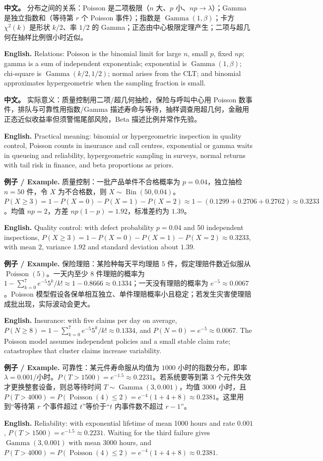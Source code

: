 \documentclass[UTF8,11pt,a4paper]{ctexart}
\newcommand{\EN}[1]{\par\noindent\textbf{English.} #1\par}
\newcommand{\EX}[2]{\par\noindent\textbf{例子 / Example.} #1\par\EN{#2}}
\newcommand{\APS}[2]{\par\noindent\textbf{中文。} #1\par\noindent\textbf{English.} #2\par\smallskip}
\begin{document}
\APS{分布之间的关系：Poisson 是二项极限（$n$ 大、$p$ 小、$np\to\lambda$）；Gamma 是独立指数和（等待第 $r$ 个 Poisson 事件）；指数是 $\operatorname{Gamma}(1,\beta)$；卡方 $\chi^2(k)$ 是形状 $k/2$、率 $1/2$ 的 Gamma；正态由中心极限定理产生；二项与超几何在抽样比例很小时近似。}{Relations: Poisson is the binomial limit for large $n$, small $p$, fixed $np$; gamma is a sum of independent exponentials; exponential is $\operatorname{Gamma}(1,\beta)$; chi-square is $\operatorname{Gamma}(k/2,1/2)$; normal arises from the CLT; and binomial approximates hypergeometric when the sampling fraction is small.}

\APS{实际意义：质量控制用二项/超几何抽检，保险与呼叫中心用 Poisson 数事件，排队与可靠性用指数/Gamma 描述寿命与等待，抽样调查用超几何，金融用正态近似收益率但须警惕尾部风险，Beta 描述比例并常作先验。}{Practical meaning: binomial or hypergeometric inspection in quality control, Poisson counts in insurance and call centres, exponential or gamma waits in queueing and reliability, hypergeometric sampling in surveys, normal returns with tail risk in finance, and beta proportions as priors.}

\EX{质量控制：一批产品单件不合格概率为 $p=0.04$，独立抽检 $n=50$ 件，令 $X$ 为不合格数，则 $X\sim\operatorname{Bin}(50,0.04)$。$P(X\ge3)=1-P(X=0)-P(X=1)-P(X=2)\approx1-(0.1299+0.2706+0.2762)\approx0.3233$。均值 $np=2$，方差 $np(1-p)=1.92$，标准差约为 $1.39$。}{Quality control: with defect probability $p=0.04$ and 50 independent inspections, $P(X\ge3)=1-P(X=0)-P(X=1)-P(X=2)\approx0.3233$, with mean $2$, variance $1.92$ and standard deviation about $1.39$.}

\EX{保险理赔：某险种每天平均理赔 $5$ 件，假定理赔件数近似服从 $\operatorname{Poisson}(5)$。一天内至少 $8$ 件理赔的概率为 $1-\sum_{k=0}^{7}e^{-5}5^k/k!\approx1-0.8666\approx0.1334$；一天没有理赔的概率为 $e^{-5}\approx0.0067$。Poisson 模型假设各保单相互独立、单件理赔概率小且稳定；若发生灾害使理赔成批出现，实际波动会更大。}{Insurance: with five claims per day on average, $P(N\ge8)=1-\sum_{k=0}^{7}e^{-5}5^k/k!\approx0.1334$, and $P(N=0)=e^{-5}\approx0.0067$. The Poisson model assumes independent policies and a small stable claim rate; catastrophes that cluster claims increase variability.}

\EX{可靠性：某元件寿命服从均值为 $1000$ 小时的指数分布，即率 $\lambda=0.001$/小时。$P(T>1500)=e^{-1.5}\approx0.2231$。若系统要等到第 $3$ 个元件失效才更换整套设备，则总等待时间 $T\sim\operatorname{Gamma}(3,0.001)$，均值 $3000$ 小时，且 $P(T>4000)=P(\operatorname{Poisson}(4)\le2)=e^{-4}(1+4+8)\approx0.2381$。这里用到“等待第 $r$ 个事件超过 $t$”等价于“$t$ 内事件数不超过 $r-1$”。}{Reliability: with exponential lifetime of mean 1000 hours and rate $0.001$, $P(T>1500)=e^{-1.5}\approx0.2231$. Waiting for the third failure gives $\operatorname{Gamma}(3,0.001)$ with mean 3000 hours, and $P(T>4000)=P(\operatorname{Poisson}(4)\le2)=e^{-4}(1+4+8)\approx0.2381$.}
\end{document}
